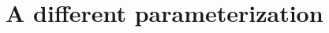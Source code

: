 \documentclass[10pt]{article}
\newcommand{\1}{\mathbf 1}
\newcommand{\ip}[1]{\left< #1 \right>}
\def\Var{{\rm Var}}
\begin{document}
{%








\section*{A different parameterization}

}
\end{document}
